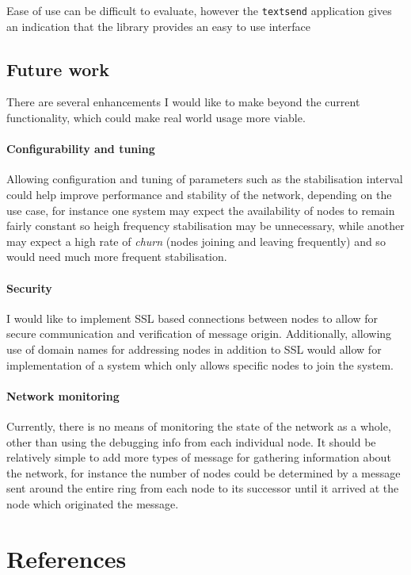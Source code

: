 \documentclass{article}
\begin{document}
Ease of use can be difficult to evaluate, however the \texttt{textsend} application gives an indication that the library provides an easy to use interface

\subsection{Future work}

There are several enhancements I would like to make beyond the current functionality, which could make real world usage more viable.
\paragraph{Configurability and tuning} Allowing configuration and tuning of parameters such as the stabilisation interval could help improve performance and stability of the network, depending on the use case, for instance one system may expect the availability of nodes to remain fairly constant so heigh frequency stabilisation may be unnecessary, while another may expect a high rate of \textit{churn} (nodes joining and leaving frequently) and so would need much more frequent stabilisation.

\paragraph{Security} I would like to implement SSL based connections between nodes to allow for secure communication and verification of message origin.
Additionally, allowing use of domain names for addressing nodes in addition to SSL would allow for implementation of a system which only allows specific nodes to join the system.

\paragraph{Network monitoring} Currently, there is no means of monitoring the state of the network as a whole, other than using the debugging info from each individual node. It should be relatively simple to add more types of message for gathering information about the network, for instance the number of nodes could be determined by a message sent around the entire ring from each node to its successor until it arrived at the node which originated the message.

\section{References}
\end{document}
